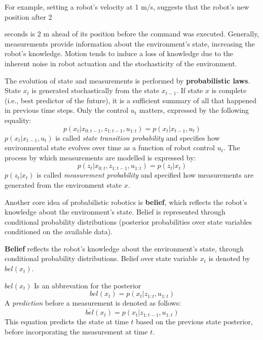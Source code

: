 For example, setting a robot's velocity at 1 m/s, suggests that the robot's new position after 2 {seconds is 2 m ahead of its position before the command was executed.
Generally, measurements provide information about the environment's state, increasing the robot's knowledge.
Motion tends to induce a loss of knowledge due to the inherent noise in robot actuation and the stochasticity of the environment.

The evolution of state and measurements is performed by \textbf{probabilistic laws}.
State $x_t$ is generated stochastically from the state $x_{t-1}$.
If state $x$ is complete (i.e., best predictor of the future), it is a sufficient summary of all that happened in previous time steps.
Only the control $u_t$ matters, expressed by the following equality:
\begin{equation}
\label{eq:background_state_trans_prob}
p(x_t | x_{0:t - 1}, z_{1:t - 1}, u_{1:t}) = p(x_t | x_{t-1}, u_t)
\end{equation}
$p(x_t | x_{t-1}, u_t)$ is called \textit{state transition probability} and specifies how environmental state evolves over time as a function of robot control $u_t$.
The process by which measurements are modelled is expressed by:
\begin{equation}
\label{eq:background_measurement_prob}
p(z_t | x_{0:t}, z_{1:t-1}, u_{1:t}) = p(z_t | x_t)
\end{equation}
$p(z_t | x_t)$ is called \textit{measurement probability} and specified how measurements are generated from the environment state $x$.

Another core idea of probabilistic robotics is \textbf{belief}, which reflects the robot's knowledge about the environment's state.
Belief is represented through conditional probability distributions (posterior probabilities over state variables conditioned on the available data).
\begin{mydef}
\textbf{Belief} reflects the robot's knowledge about the environment's state, through conditional probability distributions.
Belief over state variable $x_t$ is denoted by $bel(x_t)$.
\end{mydef}
$bel(x_t)$ Is an abbrevation for the posterior
\begin{equation}
bel(x_t) = p(x_t | z_{1:t}, u_{1:t})
\end{equation}
A \textit{prediction} before a measurement is denoted as follows:
\begin{equation}
\overline{bel}(x_t) = p(x_t | z_{1:t-1}, u_{1:t})
\end{equation}
This equation predicts the state at time $t$ based on the previous state posterior, before incorporating the measurement at time $t$.

}
